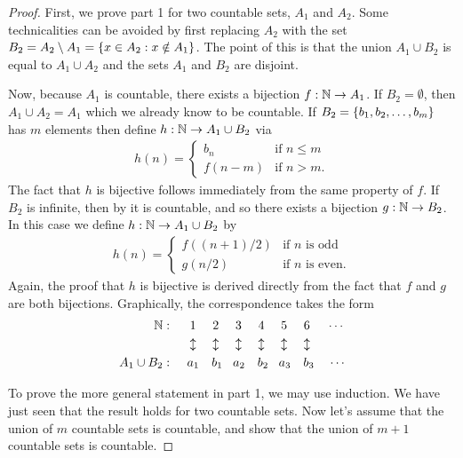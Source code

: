 \documentclass[11pt,twoside=off,numbers=noenddot]{scrbook}
\begin{document}
\begin{proof}
    First, we prove part 1 for two countable sets, $A_1$ and $A_2$. Some technicalities can be avoided by first replacing $A_2$ with the set $B_2 = A_2 \setminus A_1 = \{ x \in A_2 : x \notin A_1 \}$. The point of this is that the union $A_1 \cup B_2$ is equal to $A_1 \cup A_2$ and the sets $A_1$ and $B_2$ are disjoint.

    Now, because $A_1$ is countable, there exists a bijection $f : \mathbb N \to A_1$. If $B_2 = \emptyset$, then $A_1 \cup A_2 = A_1$ which we already know to be countable. If $B_2 = \{ b_1, b_2, \dots, b_m \}$ has $m$ elements then define $h : \mathbb N \to A_1 \cup B_2$ via
    \begin{align*}
        h(n) = \begin{cases}
            b_n & \text{if $n \leq m$} \\
            f(n - m) & \text{if $n > m$}.
        \end{cases}
    \end{align*}
    The fact that $h$ is bijective follows immediately from the same property of $f$. If $B_2$ is infinite, then by  it is countable, and so there exists a bijection $g : \mathbb N \to B_2$. In this case we define $h : \mathbb N \to A_1 \cup B_2$ by
    \begin{align*}
        h(n) = \begin{cases}
            f((n + 1) / 2) & \text{if $n$ is odd} \\
            g(n / 2) & \text{if $n$ is even}.
        \end{cases}
    \end{align*}
    Again, the proof that $h$ is bijective is derived directly from the fact that $f$ and $g$ are both bijections. Graphically, the correspondence takes the form
    \begin{align*}
        \mathbb N : \quad & \:\:\, 1 \quad\,\, 2 \quad\,\, 3 \quad\,\, 4 \quad\,\, 5 \quad\,\, 6 \quad\,\, \cdots \\
        & \,\, \updownarrow \quad\,\, \updownarrow \quad\,\, \updownarrow \quad\,\, \updownarrow \quad\,\, \updownarrow \quad\,\, \updownarrow \\
        A_1 \cup B_2 : \quad & \:\, a_1 \quad b_1 \,\,\,\,\, a_2 \quad b_2 \,\,\,\,\, a_3 \quad b_3 \:\:\,\,\,\, \cdots
    \end{align*}

    To prove the more general statement in part 1, we may use induction. We have just seen that the result holds for two countable sets. Now let's assume that the union of $m$ countable sets is countable, and show that the union of $m + 1$ countable sets is countable.


\end{proof}
\end{document}
